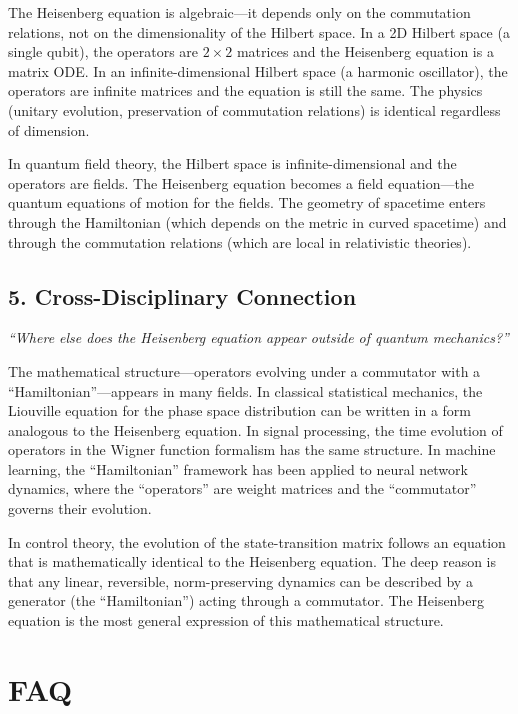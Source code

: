 \documentclass[11pt,openright]{book}
\begin{document}
The Heisenberg equation is algebraic---it depends only on the commutation relations, not on the dimensionality of the Hilbert space. In a 2D Hilbert space (a single qubit), the operators are $2\times 2$ matrices and the Heisenberg equation is a matrix ODE. In an infinite-dimensional Hilbert space (a harmonic oscillator), the operators are infinite matrices and the equation is still the same. The physics (unitary evolution, preservation of commutation relations) is identical regardless of dimension.

In quantum field theory, the Hilbert space is infinite-dimensional and the operators are fields. The Heisenberg equation becomes a field equation---the quantum equations of motion for the fields. The geometry of spacetime enters through the Hamiltonian (which depends on the metric in curved spacetime) and through the commutation relations (which are local in relativistic theories).

\subsection*{5. Cross-Disciplinary Connection}
\textit{``Where else does the Heisenberg equation appear outside of quantum mechanics?''}

The mathematical structure---operators evolving under a commutator with a ``Hamiltonian''---appears in many fields. In classical statistical mechanics, the Liouville equation for the phase space distribution can be written in a form analogous to the Heisenberg equation. In signal processing, the time evolution of operators in the Wigner function formalism has the same structure. In machine learning, the ``Hamiltonian'' framework has been applied to neural network dynamics, where the ``operators'' are weight matrices and the ``commutator'' governs their evolution.

In control theory, the evolution of the state-transition matrix follows an equation that is mathematically identical to the Heisenberg equation. The deep reason is that any linear, reversible, norm-preserving dynamics can be described by a generator (the ``Hamiltonian'') acting through a commutator. The Heisenberg equation is the most general expression of this mathematical structure.

\section*{FAQ}
\end{document}
